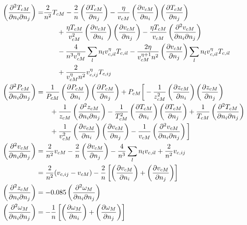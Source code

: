 \documentclass[internal,english]{sintefmemo2012}
\numberwithin{equation}{section}
\newcommand*{\pder}[2]{\left(\frac{\partial #1}{\partial #2}\right)}
\newcommand*{\pdcross}[3]{\left(\frac{\partial^2 #1}{\partial #2 \partial #3}\right)}
\begin{document}
\begin{align}
  \phantom{\pdcross{T_{cM}}{n_i}{n_j}}
  \label{eq:TcM_ij}
  & \begin{aligned}
    \mathllap{\pdcross{T_{cM}}{n_i}{n_j}} = 
    & \frac{2}{n^2} T_{cM} - \frac{2}{n} \pder{T_{cM}}{n_j} - \frac{\eta}{v_{cM}} \pder{v_{cM}}{n_{i}} \pder{T_{cM}}{n_j} \\
    & \qquad + \frac{\eta T_{cM}}{v_{cM}^2} \pder{v_{cM}}{n_i} \pder{v_{cM}}{n_j} - \frac{\eta T_{cM}}{v_{cM}} \pdcross{v_{cM}}{n_i}{n_j} \\
    & \qquad - \frac{4}{n^3 v_{cM}^\eta} \sum_l n_l v_{c,il}^\eta T_{c,il} - \frac{2 \eta}{v_{cM}^{\eta + 1} n^2} \pder{v_{cM}}{n_j} \sum_l n_l v_{c,il}^\eta T_{c,il} \\
    & \qquad + \frac{2}{v_{cM}^\eta n^2} v_{c,ij}^\eta T_{c,ij}
  \end{aligned} \\
  \label{eq:PcM_ij}
  & \begin{aligned}
    \mathllap{\pdcross{P_{cM}}{n_i}{n_j}}
    & =  \frac{1}{P_{cM}} \pder{P_{cM}}{n_i} \pder{P_{cM}}{n_j} + P_{cM} \bigg[ -\frac{1}{z_{cM}^2} \pder{z_{cM}}{n_i} \pder{z_{cM}}{n_j} \\
    & \qquad + \frac{1}{z_{cM}} \pdcross{z_{cM}}{n_i}{n_j} - \frac{1}{T_{cM}^2}\pder{T_{cM}}{n_i}\pder{T_{cM}}{n_j} + \frac{1}{T_{cM}} \pdcross{T_{cM}}{n_i}{n_j} \\
    & \qquad + \frac{1}{v_{cM}^2}\pder{v_{cM}}{n_i}\pder{v_{cM}}{n_j} - \frac{1}{v_{cM}} \pdcross{v_{cM}}{n_i}{n_j} \bigg] 
  \end{aligned} \\
  \label{eq:vcM_ij}
  & \begin{aligned}
    \mathllap{\pdcross{v_{cM}}{n_i}{n_j}}
    & = \frac{2}{n^2} v_{cM} - \frac{2}{n} \pder{v_{cM}}{n_j} - \frac{4}{n^3}\sum_l n_l v_{c,il} + \frac{2}{n^2} v_{c,ij}   \\
    & = \frac{2}{n^2} (v_{c,ij} - v_{cM}) - \frac{2}{n}\left[\pder{v_{cM}}{n_i} + \pder{v_{cM}}{n_j}\right]
  \end{aligned} \\
  \label{eq:zcM_ij}
  & \begin{aligned}
    \mathllap{\pdcross{z_{cM}}{n_i}{n_j}} & = -0.085 \pdcross{\omega_{M}}{n_i}{n_j} 
  \end{aligned} \\
  \label{eq:wM_ij}
  & \begin{aligned}
    \mathllap{\pdcross{\omega_{M}}{n_i}{n_j}} & = -\frac{1}{n} \left[\pder{\omega_M}{n_i} + \pder{\omega_M}{n_j} \right]
  \end{aligned} 
\end{align}
\end{document}

